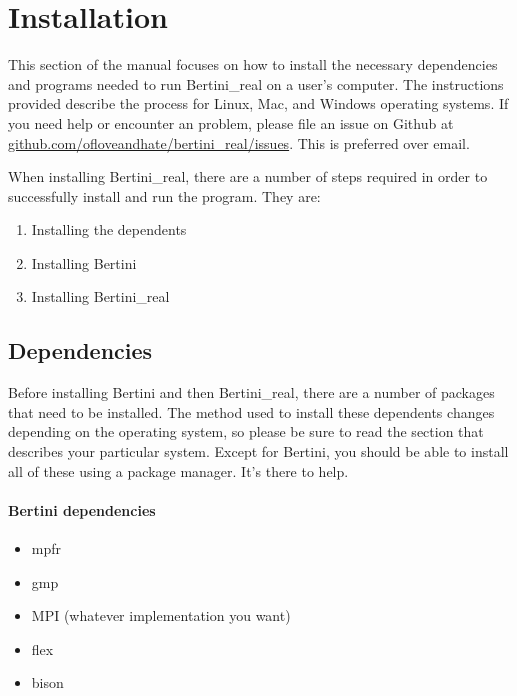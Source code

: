 
\section{Installation}
\label{sec:installation}


This section of the manual focuses on how to install the necessary dependencies and programs needed to run Bertini\_real on a user's computer. The instructions provided describe the process for Linux, Mac, and Windows operating systems.  If you need help or encounter an problem, please file an issue on Github at 
\href{https://github.com/ofloveandhate/bertini_real/issues}{github.com/ofloveandhate/bertini\_real/issues}.  
This is preferred over email.

When installing Bertini\_real, there are a number of steps required in order to successfully install and run the program. They are:
\begin{enumerate}
\item Installing the \glspl{dependent}
\item Installing Bertini
\item Installing Bertini\_real
\end{enumerate}




\subsection{Dependencies}
\label{sec:deps}

Before installing Bertini and then Bertini\_real, there are a number of packages that need to be installed. The method used to install these \glspl{dependent} changes depending on the operating system, so please be sure to read the section that describes your particular system.  Except for Bertini, you should be able to install all of these using a package manager.  It's there to help.

\paragraph{Bertini dependencies}

\begin{itemize}[noitemsep]
\item \gls{mpfr}
\item \gls{gmp}
\item MPI (whatever implementation you want)
\item flex
\item bison
\end{itemize}


